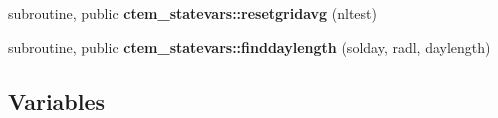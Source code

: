 \begin{DoxyCompactItemize}
\item 
\hypertarget{namespacectem__statevars_a424132cbb7cede85302f098c104b6b81}{}subroutine, public {\bfseries ctem\+\_\+statevars\+::resetgridavg} (nltest)\label{namespacectem__statevars_a424132cbb7cede85302f098c104b6b81}

\item 
\hypertarget{namespacectem__statevars_ad9e9f0c26eb20456932853a6fc897631}{}subroutine, public {\bfseries ctem\+\_\+statevars\+::finddaylength} (solday, radl, daylength)\label{namespacectem__statevars_ad9e9f0c26eb20456932853a6fc897631}

\end{DoxyCompactItemize}
\subsection*{Variables}
